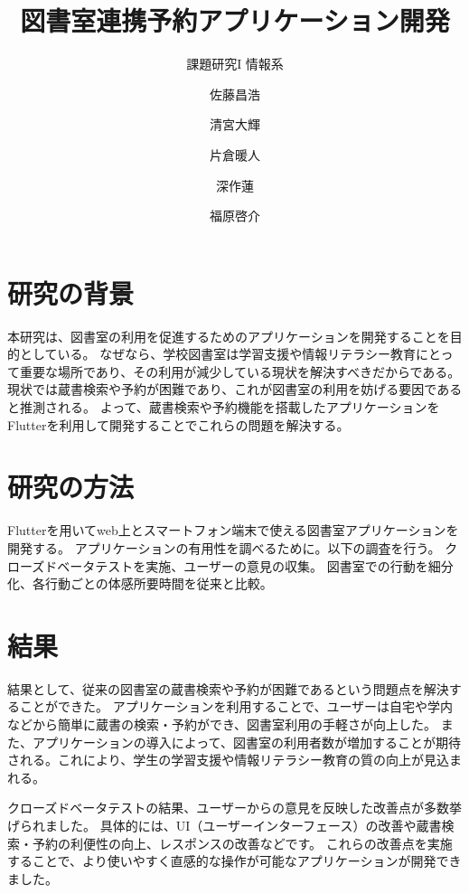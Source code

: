 \documentclass[pdflatex,ja=standard,twocolumn]{bxjsarticle}
\begin{document}
\title{図書室連携予約アプリケーション開発}
\author{課題研究I 情報系\and 佐藤昌浩 \and 清宮大輝 \and 片倉暖人 \and 深作蓮 \and 福原啓介}
\date{\vspace{-10mm}}


\section{研究の背景}
本研究は、図書室の利用を促進するためのアプリケーションを開発することを目的としている。
なぜなら、学校図書室は学習支援や情報リテラシー教育にとって重要な場所であり、その利用が減少している現状を解決すべきだからである。
現状では蔵書検索や予約が困難であり、これが図書室の利用を妨げる要因であると推測される。
よって、蔵書検索や予約機能を搭載したアプリケーションをFlutterを利用して開発することでこれらの問題を解決する。
\section{研究の方法}
Flutterを用いてweb上とスマートフォン端末で使える図書室アプリケーションを開発する。
アプリケーションの有用性を調べるために。以下の調査を行う。
クローズドベータテストを実施、ユーザーの意見の収集。
図書室での行動を細分化、各行動ごとの体感所要時間を従来と比較。
\newpage
\section{結果}
結果として、従来の図書室の蔵書検索や予約が困難であるという問題点を解決することができた。
アプリケーションを利用することで、ユーザーは自宅や学内などから簡単に蔵書の検索・予約ができ、図書室利用の手軽さが向上した。
また、アプリケーションの導入によって、図書室の利用者数が増加することが期待される。これにより、学生の学習支援や情報リテラシー教育の質の向上が見込まれる。

クローズドベータテストの結果、ユーザーからの意見を反映した改善点が多数挙げられました。
具体的には、UI（ユーザーインターフェース）の改善や蔵書検索・予約の利便性の向上、レスポンスの改善などです。
これらの改善点を実施することで、より使いやすく直感的な操作が可能なアプリケーションが開発できました。
\end{document}
